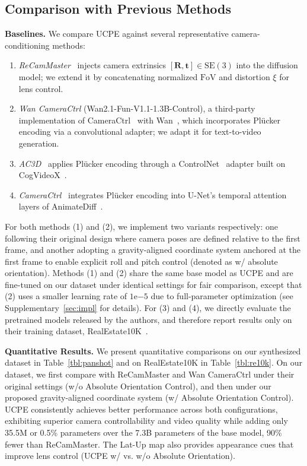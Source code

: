 \subsection{Comparison with Previous Methods}
\label{sec:cmp}

\noindent\textbf{Baselines.}
We compare UCPE against several representative camera-conditioning methods:
\begin{enumerate}[leftmargin=0pt, wide=0pt, label=(\arabic*)]
    \item \emph{ReCamMaster}~\cite{bai2025recammaster} injects camera extrinsics \(\left[\mathbf{R}, \mathbf{t}\right] \in \mathrm{SE}(3)\) into the diffusion model; we extend it by concatenating normalized \(\mathrm{FoV}\) and distortion \(\xi\) for lens control.
    \item \emph{Wan CameraCtrl} (Wan2.1-Fun-V1.1-1.3B-Control), a third-party implementation of CameraCtrl~\cite{he2024cameractrl} with Wan~\cite{wan2025wan}, which incorporates Pl\"ucker encoding via a convolutional adapter; we adapt it for text-to-video generation.
    \item \emph{AC3D}~\cite{bahmani2025ac3d} applies Pl\"ucker encoding through a ControlNet~\cite{zhang2023adding} adapter built on CogVideoX~\cite{yang2025cogvideox}.
    \item \emph{CameraCtrl}~\cite{he2024cameractrl} integrates Pl\"ucker encoding into U-Net's temporal attention layers of AnimateDiff~\cite{guo2024animatediff}.
\end{enumerate}
For both methods (1) and (2), we implement two variants respectively: one following their original design where camera poses are defined relative to the first frame, and another adopting a gravity-aligned coordinate system anchored at the first frame to enable explicit roll and pitch control (denoted as w/ absolute orientation).
Methods (1) and (2) share the same base model as UCPE and are fine-tuned on our dataset under identical settings for fair comparison, except that (2) uses a smaller learning rate of \(1\mathrm{e}{-5}\) due to full-parameter optimization (see Supplementary~\cref{sec:impl} for details).
For (3) and (4), we directly evaluate the pretrained models released by the authors, and therefore report results only on their training dataset, RealEstate10K~\cite{zhou2018stereo}.





\noindent\textbf{Quantitative Results.}
We present quantitative comparisons on our synthesized dataset in Table~\ref{tbl:panshot} and on RealEstate10K in Table~\ref{tbl:re10k}.
On our dataset, we first compare with ReCamMaster and Wan CameraCtrl under their original settings (w/o Absolute Orientation Control), and then under our proposed gravity-aligned coordinate system (w/ Absolute Orientation Control).
UCPE consistently achieves better performance across both configurations, exhibiting superior camera controllability and video quality while adding only 35.5M or 0.5\% parameters over the 7.3B parameters of the base model, 90\% fewer than ReCamMaster.
The Lat-Up map also provides appearance cues that improve lens control (UCPE w/ vs. w/o Absolute Orientation).

